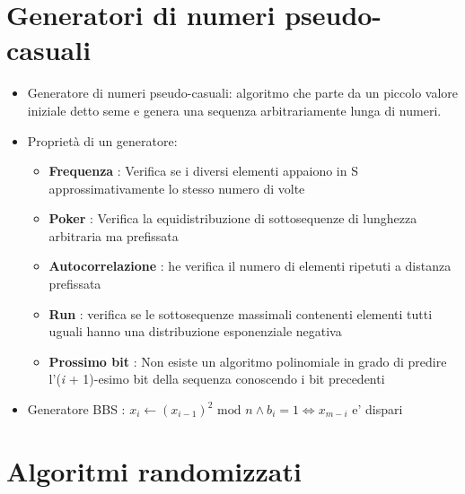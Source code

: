 \section{Generatori di numeri pseudo-casuali}

\begin{itemize}
    \item Generatore di numeri pseudo-casuali: algoritmo che parte da un piccolo valore iniziale detto seme e genera una sequenza arbitrariamente lunga di numeri.
    \item Proprietà di un generatore:
    \begin{itemize}
        \item \textbf{Frequenza} : Verifica se i diversi elementi appaiono in S approssimativamente lo stesso numero di volte
        \item \textbf{Poker} : Verifica la equidistribuzione di sottosequenze di lunghez\-za arbitraria ma prefissata
        \item \textbf{Autocorrelazione} : he verifica il numero di elementi ripetuti a distanza prefissata
        \item \textbf{Run} : verifica se le sottosequenze massimali contenenti elementi tutti uguali hanno una distribuzione esponenziale negativa
        \item \textbf{Prossimo bit} : Non esiste un algoritmo polinomiale in grado di predire l'(\textit{i} + 1)-esimo bit della sequenza conoscendo i bit precedenti
    \end{itemize} 
    \item Generatore BBS : $x_i \leftarrow (x_{i-1})^2 \text{ mod }n \wedge b_i = 1 \Leftrightarrow x_{m-i}$ e' dispari
\end{itemize}

\section{Algoritmi randomizzati}

